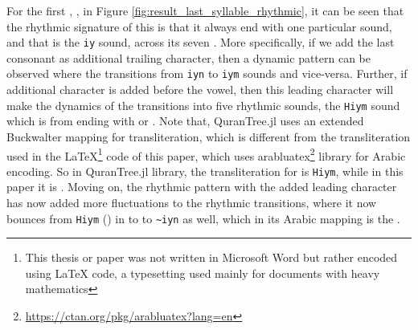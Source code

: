 For the first  ,  , in Figure \ref{fig:result_last_syllable_rhythmic}, it can be seen that the rhythmic signature of this   is that it always end with one particular sound, and that is the \texttt{iy} sound, across its seven  . More specifically, if we add the last consonant as additional trailing character, then a dynamic pattern can be observed where the   transitions from \texttt{iyn} to \texttt{iym} sounds and vice-versa. Further, if additional character is added before the vowel, then this leading character will make the dynamics of the transitions into five rhythmic sounds, the \texttt{Hiym} sound which is from   ending with  or . Note that, QuranTree.jl \cite{asaad2021qurantree} uses an extended Buckwalter \cite{buckwalter2002} mapping for transliteration, which is different from the transliteration used in the LaTeX\footnote{This thesis or paper was not written in Microsoft Word but rather encoded using LaTeX code, a typesetting used mainly for documents with heavy mathematics} code of this paper, which uses arabluatex\footnote{\url{https://ctan.org/pkg/arabluatex?lang=en}} library for Arabic encoding. So in QuranTree.jl library, the transliteration for  is \texttt{Hiym}, while in this paper it is . Moving on, the rhythmic pattern with the added leading character has now added more fluctuations to the rhythmic transitions, where it now bounces from \texttt{Hiym} () in   to   to \verb|~iyn| as well, which in its Arabic mapping is the  . 

